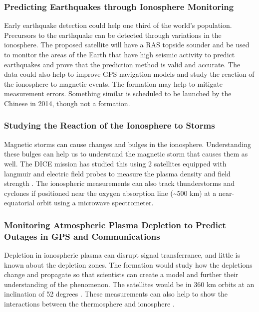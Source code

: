 \subsubsection{Predicting Earthquakes through Ionosphere Monitoring}

Early earthquake detection could help one third of the world's population. Precursors to the earthquake can be detected through variations in the ionosphere. The proposed satellite will have a RAS topside sounder and be used to monitor the areas of the Earth that have high seismic activity to predict earthquakes and prove that the prediction method is valid and accurate. The data could also help to improve GPS navigation models and study the reaction of the ionosphere to magnetic events. The formation may help to mitigate measurement errors.\cite{Ref:Jason} Something similar is scheduled to be launched by the Chinese in 2014, though not a formation\cite{Ref:Earthquake}. 


\subsubsection{Studying the Reaction of the Ionosphere to Storms }

Magnetic storms can cause changes and bulges in the ionosphere. Understanding these bulges can help us to understand the magnetic storm that causes them as well. The DICE mission has studied this using 2 satellites equipped with langmuir and electric field probes to measure the plasma density and field strength \cite{Ref:Crowley,Ref:Fish}. The ionospheric measurements can also track thunderstorms and cyclones if positioned near the oxygen absorption line (\textasciitilde{}500 km) at a near-equatorial orbit using a microwave spectrometer. \cite{Ref:Blackwell}


\subsubsection{Monitoring Atmospheric Plasma Depletion to Predict Outages in GPS and Communications}

Depletion in ionospheric plasma can disrupt signal transferrance, and little is known about the depletion zones. The formation would study how the depletions change and propagate so that scientists can create a model and further their understanding of the phenomenon. The satellites would be in 360 km orbits at an inclination of 52 degrees \cite{Ref:Krause}\cite{Ref:Bracikowski}. These measurements can also help to show the interactions between the thermosphere and ionosphere \cite{Ref:Blalthazor}.


